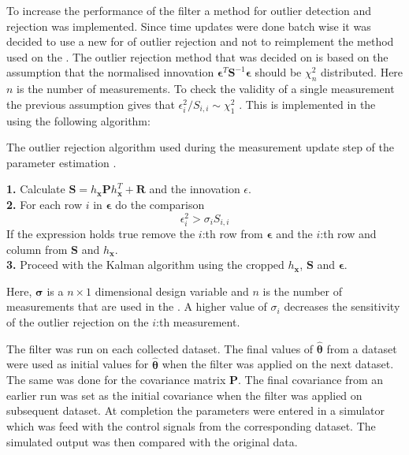 To increase the performance of the filter a method for outlier detection and rejection was implemented. Since time updates were done batch wise it was decided to use a new for of outlier rejection and not to reimplement the method used on the \abbrROV. The outlier rejection method that was decided on is based on the assumption that the normalised innovation $\boldsymbol{\epsilon}^T \boldsymbol{S}^{-1} \boldsymbol{\epsilon}$ should be $\chi_{n}^{2}$ distributed. Here $n$ is the number of measurements. To check the validity of a single measurement the previous assumption gives that $\epsilon_i^{2}/S_{i,i} \sim \chi_{1}^{2}$ \citep{sensorfusion}. This is implemented in the \abbrEKF using the following algorithm:
\begin{algorithm}[h]
\label{alg:outlier}
\caption{The outlier rejection algorithm used during the measurement update step of the parameter estimation \abbrEKF.}
\textbf{1.} Calculate $\boldsymbol{S}=h_{\boldsymbol{x}} \boldsymbol{P} h_{\boldsymbol{x}}^T + \boldsymbol{R}$ and the innovation $\epsilon$.
\\
\textbf{2.} For each row $i$ in $\boldsymbol{\epsilon}$ do the comparison
\begin{equation}
\epsilon_{i}^{2} > \sigma_i S_{i,i}
\end{equation}
If the expression holds true remove the $i$:th row from $\boldsymbol{\epsilon}$ and the $i$:th row and column from $\boldsymbol{S}$ and $h_{\boldsymbol{x}}$.\\
\textbf{3.} Proceed with the Kalman algorithm using the cropped $h_{\boldsymbol{x}}$, $\boldsymbol{S}$ and $\boldsymbol{\epsilon}$.
\end{algorithm}
Here, $\boldsymbol{\sigma}$ is a $n\times1$ dimensional design variable and $n$ is the number of measurements that are used in the \abbrEKF. A higher value of $\sigma_i$ decreases the sensitivity of the outlier rejection on the $i$:th measurement.

The filter was run on each collected dataset. The final values of $\hat{\boldsymbol{\theta}}$ from a dataset were used as initial values for $\hat{\boldsymbol{\theta}}$ when the filter was applied on the next dataset. The same was done for the covariance matrix $\boldsymbol{P}$. The final covariance from an earlier run was set as the initial covariance when the filter was applied on subsequent dataset. At completion the parameters were entered in a simulator which was feed with the control signals from the corresponding dataset. The simulated  output was then compared with the original data.

